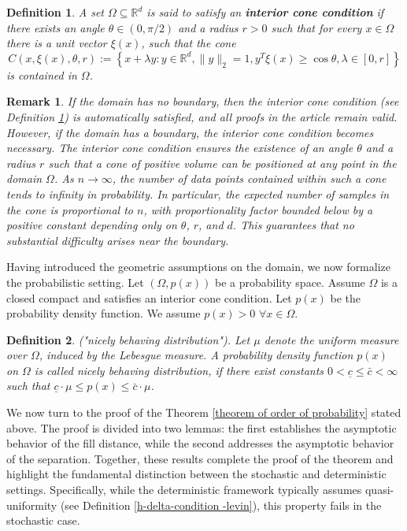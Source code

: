 \documentclass{article}
\newtheorem{definition}
{Definition}
\newtheorem{remark}{Remark}
\begin{document}
\begin{definition}
    A set $\Omega\subseteq\mathbb{R}^d$ is said to satisfy an \textbf{interior cone condition} if there exists an angle $\theta\in (0,\pi/2)$ and a radius $r > 0$ such that for every $x\in \Omega$ there is a unit vector $\xi(x)$, such that the cone
    \begin{equation}
        C(x, \xi(x), \theta, r):=\left\{x+\lambda y: y \in \mathbb{R}^d,\|y\|_2=1, y^T \xi(x) \geq \cos \theta, \lambda \in[0, r]\right\}
    \end{equation}
    is contained in $\Omega$.
    \label{cone_cond}
\end{definition}

\begin{remark}
    If the domain has no boundary, then the interior cone condition (see Definition \ref{cone_cond}) is automatically satisfied, and all proofs in the article remain valid. However, if the domain has a boundary, the interior cone condition becomes necessary. The interior cone condition ensures the existence of an angle $\theta$ and a radius $r$ such that a cone of positive volume can be positioned at any point in the domain $\Omega$. As $n \to \infty$, the number of data points contained within such a cone tends to infinity in probability. In particular, the expected number of samples in the cone is proportional to $n$, with proportionality factor bounded below by a positive constant depending only on $\theta$, $r$, and $d$. This guarantees that no substantial difficulty arises near the boundary.
\end{remark}

Having introduced the geometric assumptions on the domain, we now formalize the probabilistic setting.
Let $(\Omega,p(x))$ be a probability space. 
Assume $\Omega$ is a closed compact and satisfies an interior cone condition. Let $p(x)$ be the probability density function. We assume $p(x)>0$ $\forall x\in \Omega$.

\begin{definition} ("nicely behaving distribution").
    Let $\mu$ denote the uniform measure over $\Omega$, induced by the Lebesgue measure.
A probability density function $p(x)$ on $\Omega$ is called nicely behaving distribution, if there exist constants $0<\underline{c} \leq \bar{c}<\infty$ such that $\underline{c} \cdot \mu \leq p(x) \leq \bar{c} \cdot \mu$.
    \label{NicelyDef}
\end{definition}

We now turn to the proof of the Theorem \ref{theorem of order of probability} stated above. The proof is divided into two lemmas: the first establishes the asymptotic behavior of the fill distance, while the second addresses the asymptotic behavior of the separation. Together, these results complete the proof of the theorem and highlight the fundamental distinction between the stochastic and deterministic settings. Specifically, while the deterministic framework typically assumes quasi-uniformity (see Definition \ref{h-delta-condition -levin}), this property fails in the stochastic case.
\end{document}
